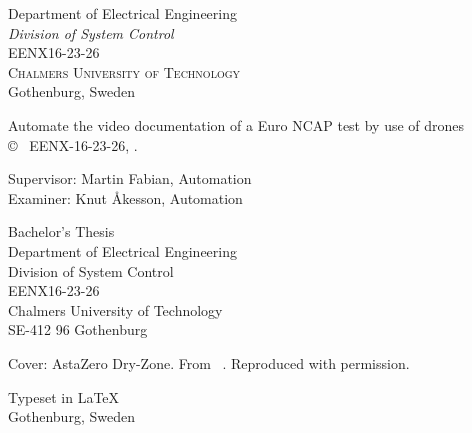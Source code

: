 \begin{center}
\begin{figure}[H]
    \fi
	\end{figure}	\vspace{5mm}	
	
	Department of Electrical Engineering \\
	\emph{Division of System Control}\\
	EENX16-23-26\\
	\textsc{Chalmers University of Technology} \\
	Gothenburg, Sweden \the\year \\
\end{center}


\newpage
\thispagestyle{plain}

Automate the video documentation of a Euro
NCAP test by use of drones\\
\copyright ~ EENX-16-23-26, \the\year. \setlength{\parskip}{1cm}

Supervisor: Martin Fabian, Automation\\
Examiner: Knut Åkesson, Automation \setlength{\parskip}{1cm}

Bachelor's Thesis \the\year\\	
Department of Electrical Engineering\\
Division of System Control\\
EENX16-23-26\\
Chalmers University of Technology\\
SE-412 96 Gothenburg\\ \setlength{\parskip}{0.5cm}

\vfill
Cover: AstaZero Dry-Zone. From ~\cite{AstaZeroAboutUs}. Reproduced with permission.

Typeset in \LaTeX \tagtemp\\
Gothenburg, Sweden \the\year

